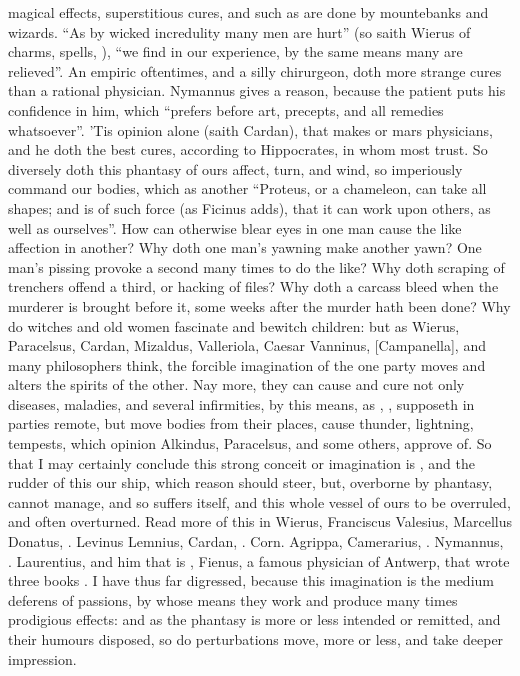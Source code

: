 magical effects, superstitious cures, and such as are done by mountebanks and
wizards. \enquote{As by wicked incredulity many men are hurt} (so saith
Wierus of charms, spells, \etc{}), \enquote{we find in our
experience, by the same means many are relieved}. An empiric oftentimes, and a
silly chirurgeon, doth more strange cures than a rational physician. Nymannus
gives a reason, because the patient puts his confidence in him,
which \Avicenna{} \enquote{prefers before art, precepts, and all
remedies whatsoever}. 'Tis opinion alone (saith Cardan),
that makes or mars physicians, and he doth the best cures, according to
Hippocrates, in whom most trust. So diversely doth this phantasy of ours
affect, turn, and wind, so imperiously command our bodies, which as another
\enquote{Proteus, or a chameleon, can take all shapes; and is of
such force (as Ficinus adds), that it can work upon others, as well as
ourselves}. How can otherwise blear eyes in one man cause the like affection in
another? Why doth one man's yawning make another yawn? One
man's pissing provoke a second many times to do the like? Why doth scraping of
trenchers offend a third, or hacking of files? Why doth a carcass bleed when
the murderer is brought before it, some weeks after the murder hath been done?
Why do witches and old women fascinate and bewitch children: but as Wierus,
Paracelsus, Cardan, Mizaldus, Valleriola, Caesar Vanninus,
[Campanella], and many philosophers think, the forcible
imagination of the one party moves and alters the spirits of the other. Nay
more, they can cause and cure not only diseases, maladies, and several
infirmities, by this means, as \Avicenna{}, , supposeth in parties remote, but move bodies from their places,
cause thunder, lightning, tempests, which opinion Alkindus, Paracelsus, and
some others, approve of. So that I may certainly conclude this strong conceit
or imagination is , and the rudder of this our ship, which
reason should steer, but, overborne by phantasy, cannot manage, and so suffers
itself, and this whole vessel of ours to be overruled, and often overturned.
Read more of this in Wierus,  Franciscus Valesius, 
Marcellus Donatus, .
Levinus Lemnius, 
Cardan, . Corn. Agrippa,
 Camerarius,
. Nymannus,
. Laurentius, and him that is , Fienus, a famous physician of Antwerp, that wrote three books . I have thus far digressed, because this imagination is
the medium deferens of passions, by whose means they work and produce many
times prodigious effects: and as the phantasy is more or less intended or
remitted, and their humours disposed, so do perturbations move, more or less,
and take deeper impression.

